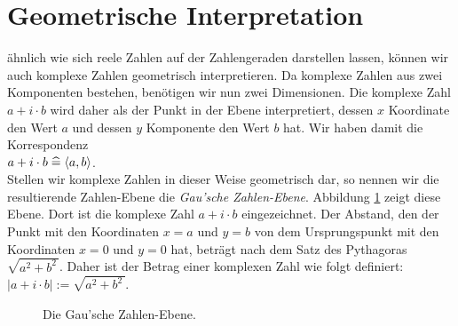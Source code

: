 \section{Geometrische Interpretation}
\"{a}hnlich wie sich reele Zahlen auf der Zahlengeraden darstellen lassen, k\"{o}nnen wir auch komplexe Zahlen
geometrisch interpretieren.  Da komplexe Zahlen aus zwei Komponenten bestehen, ben\"{o}tigen wir nun zwei
Dimensionen.  Die komplexe Zahl $a + i \cdot b$ wird daher als der Punkt in der Ebene interpretiert,
dessen $x$ Koordinate den Wert $a$ und dessen $y$ Komponente den Wert $b$ hat.  Wir haben damit die
Korrespondenz 
\\[0.2cm]
\hspace*{1.3cm}
$a + i \cdot b \;\widehat{=}\; \pair(a,b)$.
\\[0.2cm]
Stellen wir komplexe Zahlen in dieser Weise geometrisch dar, so nennen wir die resultierende Zahlen-Ebene
die \emph{Gau\3'sche Zahlen-Ebene}.  Abbildung \ref{fig:gauss-ebene.eps} zeigt diese Ebene.
Dort ist die komplexe Zahl $a + i \cdot b$ eingezeichnet.  Der Abstand, den der Punkt mit den Koordinaten
$x = a$ und $y = b$ von dem Ursprungspunkt mit den Koordinaten $x = 0$ und $y = 0$ hat, betr\"{a}gt nach dem
Satz des Pythagoras $\sqrt{a^2 + b^2\,}$.  Daher ist der Betrag einer komplexen Zahl wie folgt definiert:
\\[0.2cm]
\hspace*{1.3cm}
$|a + i \cdot b| := \sqrt{a^2 + b^2\,}$.


\begin{figure}[!ht]
  \centering
  \caption{Die Gau\3'sche Zahlen-Ebene.}
  \label{fig:gauss-ebene.eps}
\end{figure}

